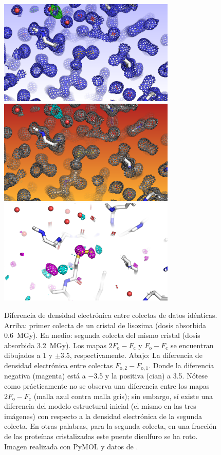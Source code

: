 \begin{figure}[hb]
	\includegraphics[width=0.75\textwidth]{imgs/before}
	\includegraphics[width=0.75\textwidth]{imgs/after}
	\includegraphics[width=0.75\textwidth]{imgs/diff}
	\caption[Diferencia de densidad electrónica]{Diferencia de densidad electrónica entre colectas de datos idénticas. Arriba: primer colecta de un cristal de lisozima (dosis absorbida \SI{0.6}{\mega\gray}). En medio: segunda colecta del mismo cristal (dosis absorbida \SI{3.2}{\mega\gray}). Los mapas $2F_{\mathrm{o}}-F_{\mathrm{c}}$ y $F_{\mathrm{o}}-F_{\mathrm{c}}$ se encuentran dibujados a \SI{1}{\sigma} y $\pm$\SI{3.5}{\sigma}, respectivamente. Abajo: La diferencia de densidad electrónica entre colectas $F_{\mathrm{o,2}}-F_{\mathrm{o,1}}$. Donde la diferencia negativa (magenta) está a \SI{-3.5}{\sigma} y la positiva (cian) a \SI{3.5}{\sigma}. Nótese como prácticamente no se observa una diferencia entre los mapas $2F_{\mathrm{o}}-F_{\mathrm{c}}$ (malla azul contra malla gris); sin embargo, sí existe una diferencia del modelo estructural inicial (el mismo en las tres imágenes) con respecto a la densidad electrónica de la segunda colecta. En otras palabras, para la segunda colecta, en una fracción de las proteínas cristalizadas este puente disulfuro se ha roto. Imagen realizada con PyMOL \cite{pymol} y datos de \cite{Nanao2005}. }
\end{figure}


